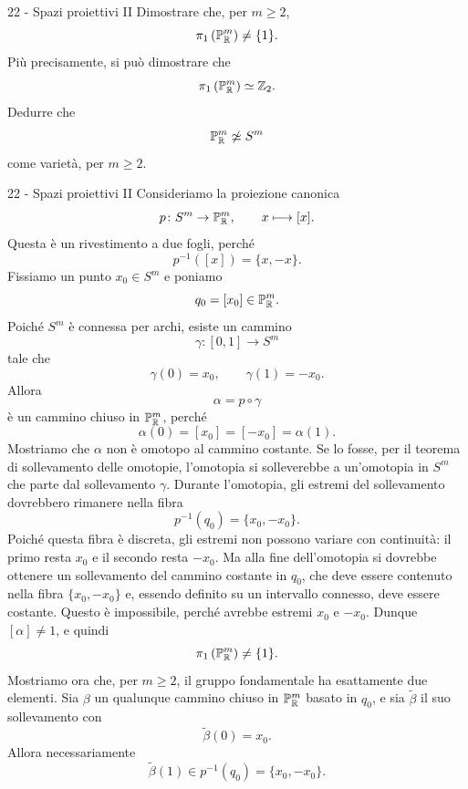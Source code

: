 \documentclass[a4paper]{article}
\begin{document}
\begin{snippetexercise}{22 - Spazi proiettivi II}
    Dimostrare che, per \(m\geq 2\),
    \[
        \pi_1\left(\mathbb{P}^m_{\mathbb{R}}\right)\neq \{1\}.
    \]
    Più precisamente, si può dimostrare che
    \[
        \pi_1\left(\mathbb{P}^m_{\mathbb{R}}\right)\simeq \mathbb{Z}_2.
    \]
    Dedurre che
    \[
        \mathbb{P}^m_{\mathbb{R}}\not\simeq S^m
    \]
    come varietà, per \(m\geq 2\).
\end{snippetexercise}

\begin{snippetsolution}{22 - Spazi proiettivi II}
    Consideriamo la proiezione canonica
    \[
        p\colon S^m\to\mathbb{P}^m_{\mathbb{R}},
        \qquad
        x\longmapsto [x].
    \]
    Questa è un rivestimento a due fogli, perché
    \[
        p^{-1}([x])=\{x,-x\}.
    \]
    Fissiamo un punto \(x_0\in S^m\) e poniamo
    \[
        q_0=[x_0]\in\mathbb{P}^m_{\mathbb{R}}.
    \]
    Poiché \(S^m\) è connessa per archi, esiste un cammino
    \[
        \gamma\colon[0,1]\to S^m
    \]
    tale che
    \[
        \gamma(0)=x_0,
        \qquad
        \gamma(1)=-x_0.
    \]
    Allora
    \[
        \alpha=p\circ\gamma
    \]
    è un cammino chiuso in \(\mathbb{P}^m_{\mathbb{R}}\), perché
    \[
        \alpha(0)=[x_0]=[-x_0]=\alpha(1).
    \]
    Mostriamo che \(\alpha\) non è omotopo al cammino costante. Se lo fosse, per il teorema di sollevamento delle omotopie, l'omotopia si solleverebbe a un'omotopia in \(S^m\) che parte dal sollevamento \(\gamma\). Durante l'omotopia, gli estremi del sollevamento dovrebbero rimanere nella fibra
    \[
        p^{-1}(q_0)=\{x_0,-x_0\}.
    \]
    Poiché questa fibra è discreta, gli estremi non possono variare con continuità: il primo resta \(x_0\) e il secondo resta \(-x_0\). Ma alla fine dell'omotopia si dovrebbe ottenere un sollevamento del cammino costante in \(q_0\), che deve essere contenuto nella fibra \(\{x_0,-x_0\}\) e, essendo definito su un intervallo connesso, deve essere costante. Questo è impossibile, perché avrebbe estremi \(x_0\) e \(-x_0\). Dunque \([\alpha]\neq 1\), e quindi
    \[
        \pi_1\left(\mathbb{P}^m_{\mathbb{R}}\right)\neq\{1\}.
    \]
    Mostriamo ora che, per \(m\geq2\), il gruppo fondamentale ha esattamente due elementi. Sia \(\beta\) un qualunque cammino chiuso in \(\mathbb{P}^m_{\mathbb{R}}\) basato in \(q_0\), e sia \(\widetilde{\beta}\) il suo sollevamento con
    \[
        \widetilde{\beta}(0)=x_0.
    \]
    Allora necessariamente
    \[
        \widetilde{\beta}(1)\in p^{-1}(q_0)=\{x_0,-x_0\}.
\]
\end{snippetsolution}
\end{document}
